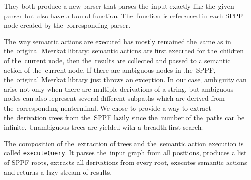 They both produce a new parser that parses the~input exactly like the~given parser but also have a bound function.
The~function is referenced in each SPPF node created by the~corresponding parser.

The~way semantic actions are executed has mostly remained the~same as in the~original Meerkat library: semantic actions are first executed for the~children of the~current node, then the~results are collected and passed to a semantic action of the~current node.
If there are ambiguous nodes in the~SPPF, the~original Meerkat library just throws an exception.
In our case, ambiguity can arise not only when there are multiple derivations of a string, but ambiguous nodes can also represent several different subpaths which are derived from the~corresponding nonterminal.
We chose to provide a way to extract the~derivation trees from the~SPPF lazily since the~number of the~paths can be infinite.
Unambiguous trees are yielded with a breadth-first search.

The~composition of the~extraction of trees and the~semantic action execution is called \lstinline{executeQuery}.
It parses the~input graph from all positions, produces a list of SPPF roots, extracts all derivations from every root, executes semantic actions and returns a lazy stream of results.